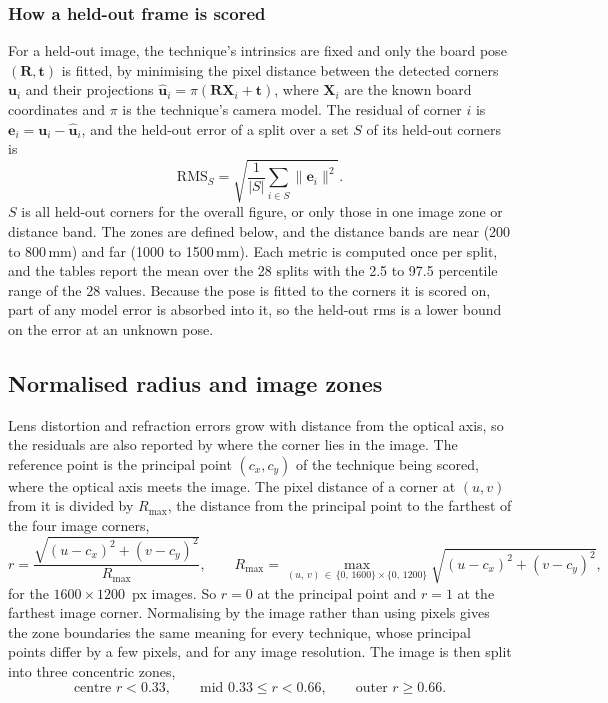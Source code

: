 \subsubsection*{How a held-out frame is scored}
For a held-out image, the technique's intrinsics are fixed and only the board pose $(\mathbf{R},\mathbf{t})$ is
fitted, by minimising the pixel distance between the detected corners $\mathbf{u}_i$ and their projections
$\hat{\mathbf{u}}_i = \pi(\mathbf{R}\mathbf{X}_i + \mathbf{t})$, where $\mathbf{X}_i$ are the known board
coordinates and $\pi$ is the technique's camera model. The residual of corner $i$ is
$\mathbf{e}_i = \mathbf{u}_i - \hat{\mathbf{u}}_i$, and the held-out error of a split over a set $S$ of its
held-out corners is
\begin{equation}
  \mathrm{RMS}_S = \sqrt{\frac{1}{|S|}\sum_{i\in S} \lVert \mathbf{e}_i \rVert^2 }.
\end{equation}
$S$ is all held-out corners for the overall figure, or only those in one image zone or distance band. The zones
are defined below, and the distance bands are near (200 to 800\,mm) and far (1000 to 1500\,mm). Each metric is
computed once per split, and the tables report the mean over the 28 splits with the 2.5 to 97.5 percentile range
of the 28 values. Because the pose is fitted to the corners it is scored on, part of any model error is absorbed
into it, so the held-out \gls{rms} is a lower bound on the error at an unknown pose.

\subsection*{Normalised radius and image zones}
\label{app:heldout:zones}

Lens distortion and refraction errors grow with distance from the optical axis, so the residuals are also
reported by where the corner lies in the image. The reference point is the principal point $(c_x, c_y)$ of the
technique being scored, where the optical axis meets the image. The pixel distance of a corner at $(u, v)$ from
it is divided by $R_{\max}$, the distance from the principal point to the farthest of the four image corners,
\begin{equation}
  r = \frac{\sqrt{(u - c_x)^2 + (v - c_y)^2}}{R_{\max}}, \qquad
  R_{\max} = \max_{(u,\,v)\,\in\,\{0,\,1600\}\times\{0,\,1200\}} \sqrt{(u - c_x)^2 + (v - c_y)^2},
  \label{eq:app:radius}
\end{equation}
for the $1600 \times 1200$~px images. So $r = 0$ at the principal point and $r = 1$ at the farthest image corner.
Normalising by the image rather than using pixels gives the zone boundaries the same meaning for every technique,
whose principal points differ by a few pixels, and for any image resolution. The image is then split into three
concentric zones,
\begin{equation}
  \text{centre } r < 0.33, \qquad \text{mid } 0.33 \le r < 0.66, \qquad \text{outer } r \ge 0.66 .
\end{equation}

